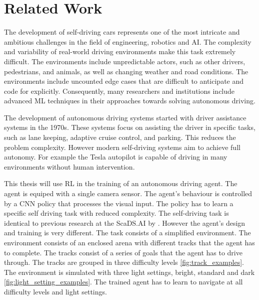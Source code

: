 \chapter{Related Work}
\label{cha:Related Work}
\acresetall


The development of self-driving cars represents one of the most intricate and ambitious challenges in the field of engineering, robotics and \ac{AI}. The complexity and variability of real-world driving environments make this task extremely difficult. The environments include unpredictable actors, such as other drivers, pedestrians, and animals, as well as changing weather and road conditions. The environments include uncounted edge cases that are difficult to anticipate and code for explicitly. Consequently, many researchers and institutions include advanced \ac{ML} techniques in their approaches towards solving autonomous driving.

The development of autonomous driving systems started with driver assistance systems in the 1970s. These systems focus on assisting the driver in specific tasks, such as lane keeping, adaptive cruise control, and parking. This reduces the problem complexity. However modern self-driving systems aim to achieve full autonomy. For example the Tesla autopilot is capable of driving in many environments without human intervention.

This thesis will use \acl{RL} in the training of an autonomous driving agent. The agent is equiped with a single camera sensor. The agent's behaviour is controlled by a \ac{CNN} policy that processes the visual input. The policy has to learn a specific self driving task with reduced complexity. The self-driving task is identical to previous research at the ScaDS.AI by \textcite{maximilian}. However the agent's design and training is very different.
The task consists of a simplified environment. The environment consists of an enclosed arena with different tracks that the agent has to complete. The tracks consist of a series of goals that the agent has to drive through. The tracks are grouped in three difficulty levels \ref{fig:track_examples}.
The environment is simulated with three light settings, bright, standard and dark \ref{fig:light_setting_examples}. The trained agent has to learn to navigate at all difficulty levels and light settings.

